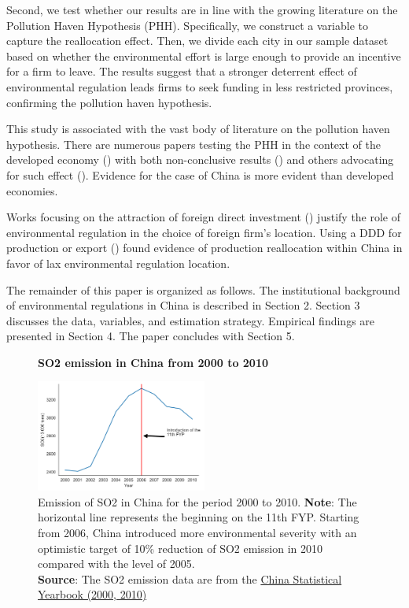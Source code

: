 \documentclass[12pt]{article}
\begin{document}
Second, we test whether our results are in line with the growing literature on the Pollution Haven Hypothesis (PHH). Specifically, we construct a variable to capture the reallocation effect. Then, we divide each city in our sample dataset based on whether the environmental effort is large enough to provide an incentive for a firm to leave. The results suggest that a stronger deterrent effect of environmental regulation leads firms to seek funding in less restricted provinces, confirming the pollution haven hypothesis.

This study is associated with the vast body of literature on the pollution haven hypothesis. There are numerous papers testing the PHH in the context of the developed economy (\cite{Hanna2010-oa, Millimet2016-wz}) with both non-conclusive results (\cite{Smarzynska2003-aw,Eskeland2003-ex}) and others advocating for such effect (\cite{Becker2000-bv, Keller2002-yh, Copeland2004-vc}). Evidence for the case of China is more evident than developed economies.

Works focusing on the attraction of foreign direct investment (\cite{Dean2009-fw, Cai2016-br}) justify the role of environmental regulation in the choice of foreign firm's location. Using a DDD for production or export (\cite{Hering2014-af, Chen2018-ki, Shi2018-zk}) found evidence of production reallocation within China in favor of lax environmental regulation location.

The remainder of this paper is organized as follows. The institutional background of environmental regulations in China is described in Section 2. Section 3 discusses the data, variables, and estimation strategy. Empirical findings are presented in Section 4. The paper concludes with Section 5.

\begin{figure}[ht]
    \centering
    \textbf{SO2 emission in China from 2000 to 2010}\par\medskip
    \includegraphics[width=0.5\textwidth]{fig_1}
    \caption{Emission of SO2 in China for the period 2000 to 2010. \textbf{Note}: The horizontal line represents the beginning on the 11th FYP. Starting from 2006, China introduced more environmental severity with an optimistic target of 10\% reduction of SO2 emission in 2010 compared with the level of 2005.\\
    \textbf{Source}: The SO2 emission data are from the \href{http://www.stats.gov.cn/english/Statisticaldata/AnnualData/}{China Statistical Yearbook (2000, 2010)}}
    \label{fig:figure1}
\end{figure}
\end{document}
